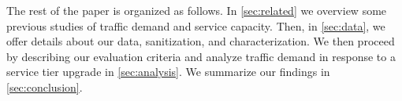 
The rest of the paper is organized as follows. In \autoref{sec:related} we 
overview some previous studies of traffic demand and service capacity. Then, in 
\autoref{sec:data}, we offer details about our data, sanitization, and 
characterization. We then proceed by describing our evaluation criteria and 
analyze traffic demand in response to a service tier upgrade in 
\autoref{sec:analysis}.
We summarize our findings in 
\autoref{sec:conclusion}.

